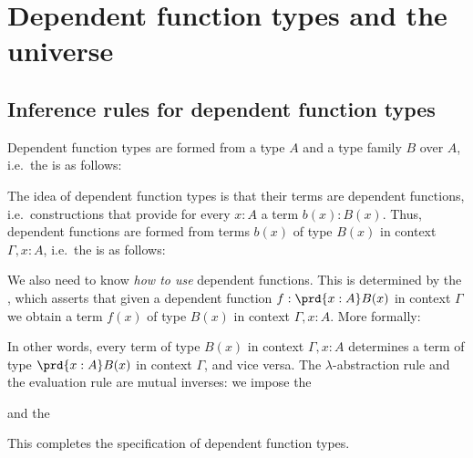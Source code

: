 \chapter{Dependent function types and the universe}

\section{Inference rules for dependent function types}

Dependent function types are formed from a type $A$ and a type family $B$ over $A$, i.e.~the  is as follows:
\begin{prooftree}
\end{prooftree}
The idea of dependent function types is that their terms are dependent functions, i.e.~constructions that provide for every $x:A$ a term $b(x):B(x)$. Thus, dependent functions are formed from terms $b(x)$ of type $B(x)$ in context $\Gamma,x:A$, i.e.~the  is as follows:
\begin{prooftree}
\end{prooftree}
We also need to know \emph{how to use} dependent functions.
This is determined by the , which asserts that given a dependent function $f:\prd{x:A}B(x)$ in context $\Gamma$ we obtain a term $f(x)$ of type $B(x)$ in context $\Gamma,x:A$. More formally:
\begin{prooftree}
\end{prooftree}
In other words, every term of type $B(x)$ in context $\Gamma,x:A$ determines a term of type $\prd{x:A}B(x)$ in context $\Gamma$, and vice versa. The $\lambda$-abstraction rule and the evaluation rule are mutual inverses: we impose the 
\begin{prooftree}
\end{prooftree}
and the 
\begin{prooftree}
\end{prooftree}
This completes the specification of dependent function types.

